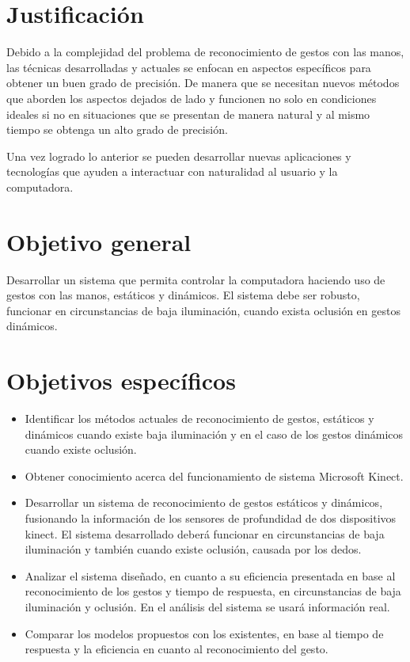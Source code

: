 \section{Justificaci\'on}\label{sec:Just}

Debido a la complejidad del problema de reconocimiento de gestos con las manos, las técnicas desarrolladas y actuales se enfocan en aspectos específicos para obtener un buen grado de precisión. De manera que se necesitan nuevos métodos que aborden los aspectos dejados de lado y funcionen no solo en condiciones ideales si no en situaciones que se presentan de manera natural y al mismo tiempo se obtenga un alto grado de precisión.  

Una vez logrado lo anterior se pueden desarrollar nuevas aplicaciones y tecnologías que ayuden a interactuar con naturalidad al usuario y la computadora.

\section{Objetivo general}\label{sec:ObjetivoGeneral}
 
Desarrollar un sistema que permita controlar la computadora haciendo uso de gestos con las manos, estáticos y dinámicos. El sistema debe ser robusto, funcionar en circunstancias de baja iluminación, cuando exista oclusión en gestos dinámicos.

\section{Objetivos espec\'ificos}\label{sec:objetivosEspecificos}

\begin{itemize}
	\item Identificar los m\'etodos actuales de reconocimiento de gestos, estáticos y din\'amicos cuando existe baja iluminación  y en el caso de los gestos dinámicos cuando existe oclusión. 
	
	\item  Obtener conocimiento acerca del funcionamiento de sistema Microsoft Kinect.
	
	\item Desarrollar un sistema de reconocimiento de gestos estáticos y dinámicos, fusionando la información de los sensores de  profundidad de dos dispositivos kinect. El sistema desarrollado deberá funcionar en circunstancias de baja iluminación y también cuando existe oclusión, causada por los dedos. 
	
	\item Analizar el sistema dise\~nado, en cuanto a su eficiencia presentada en base al reconocimiento de los gestos y tiempo de respuesta, en circunstancias de baja iluminación y oclusión. En el análisis del sistema se usar\'a información real.  
	
	\item Comparar los modelos propuestos  con los existentes, en base al tiempo de respuesta y la eficiencia en cuanto al reconocimiento del gesto. 
\end{itemize}


